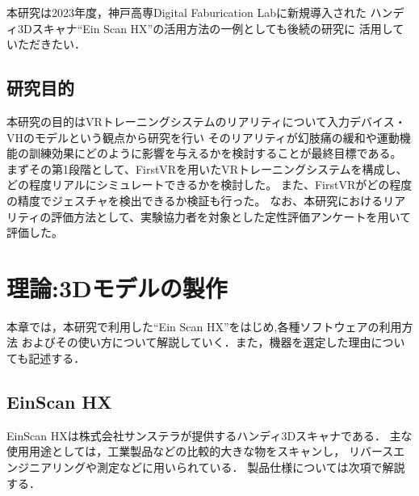 \documentclass{ltjsreport}
\begin{document}
	本研究は2023年度，神戸高専Digital Faburication Labに新規導入された
	ハンディ3Dスキャナ``Ein Scan HX''\cite{ref:6}の活用方法の一例としても後続の研究に
	活用していただきたい．

	\section{研究目的}
	本研究の目的はVRトレーニングシステムのリアリティについて入力デバイス・VHのモデルという観点から研究を行い
	そのリアリティが幻肢痛の緩和や運動機能の訓練効果にどのように影響を与えるかを検討することが最終目標である。
	まずその第1段階として、FirstVRを用いたVRトレーニングシステムを構成し、どの程度リアルにシミュレートできるかを検討した。
	また、FirstVRがどの程度の精度でジェスチャを検出できるか検証も行った。
	なお、本研究におけるリアリティの評価方法として、実験協力者を対象とした定性評価アンケートを用いて評価した。

\chapter{理論:3Dモデルの製作}
	本章では，本研究で利用した``Ein Scan HX''をはじめ,各種ソフトウェアの利用方法
	およびその使い方について解説していく．また，機器を選定した理由についても記述する．

	\section{EinScan HX}
		EinScan HXは株式会社サンステラが提供するハンディ3Dスキャナである．
		主な使用用途としては，工業製品などの比較的大きな物をスキャンし，
		リバースエンジニアリングや測定などに用いられている．
		製品仕様については次項で解説する．
\end{document}
